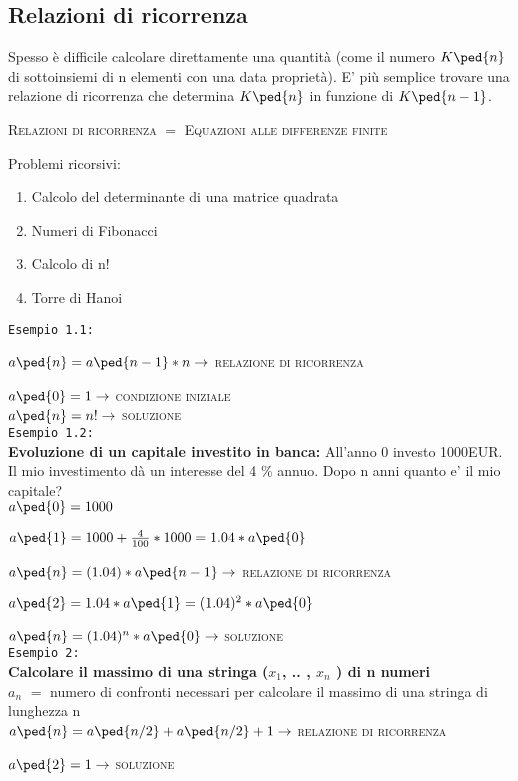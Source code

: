 \subsection{Relazioni di ricorrenza}
Spesso è difficile calcolare direttamente una quantità (come il numero \( K\ped{n}\)
di sottoinsiemi di n
elementi con una data proprietà). E' più semplice trovare una relazione di ricorrenza che
determina \( K\ped{n} \) in funzione di \( K\ped{n-1} \). \\
\begin{center}
\textsc{Relazioni di ricorrenza $=$ Equazioni alle differenze finite}
\end{center}

Problemi ricorsivi:
\begin{enumerate}
\item Calcolo del determinante di una matrice quadrata
\item Numeri di Fibonacci
\item Calcolo di n!
\item Torre di Hanoi
\end{enumerate} 

\texttt{Esempio 1.1:} \par
    \(a\ped{n} = a\ped{n-1} * n \rightarrow \) \textsc{relazione di ricorrenza} \par
    \(a\ped{0} = 1 \rightarrow \) \textsc{condizione iniziale} \\

    \( a\ped{n} = n! \rightarrow \) \textsc{soluzione} \\

\texttt{Esempio 1.2:} \\
\textbf{Evoluzione di un capitale investito in banca:}  All'anno 0 investo 1000EUR. Il mio investimento dà un interesse del 4 \% annuo. Dopo n anni quanto e' il mio capitale? \\

\(a\ped{0} = 1000 \) \par
\(a\ped{1} = 1000 + \frac{4}{100} * 1000 = 1.04 * a\ped{0} \) \par
\(a\ped{n} = (1.04) * a\ped{n-1} \rightarrow \) \textsc{relazione di ricorrenza} \par

\(a\ped{2} = 1.04 * a\ped{1} = (1.04)^2 * a\ped{0} \) \par

\(a\ped{n} = (1.04)^n * a\ped{0} \rightarrow \) \textsc{soluzione} 
\\

\texttt{Esempio 2:} \\
\textbf{Calcolare il massimo di una stringa ($x_1$, .. , $x_n$ ) di n numeri} \\
$a_n$ $=$ numero di confronti necessari per calcolare il massimo di una stringa di lunghezza n \\

\( a\ped{n} = a\ped{n/2} + a\ped{n/2} +1 \rightarrow \) \textsc{relazione di ricorrenza} \par

\( a\ped{2} = 1 \rightarrow \) \textsc{soluzione} \par 

\newpage
